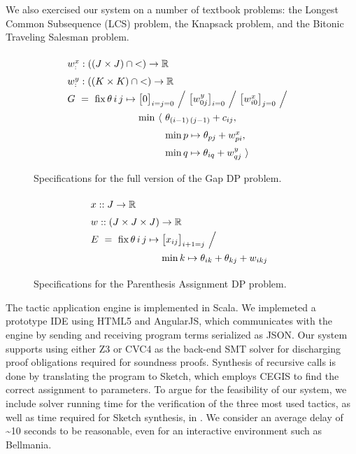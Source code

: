 \medskip
We also exercised our system on a number of textbook problems:
the Longest Common Subsequence (LCS) problem, the Knapsack problem,
and the Bitonic Traveling Salesman problem.

\begin{figure}
\[
  \renewcommand\arraystretch{1.5}
  \begin{array}{@{}l@{}l@{}l@{}}
    \lspan3{\xw :: ((J\times J)\cap{<})\to\R} \\
    \lspan3{\yw :: ((K\times K)\cap{<})\to\R} \\
    G ~=~ \fix \theta\,i\,j\mapsto{}
      & \lspan2{\big[0\big]_{i=j=0} ~\Big/~ \big[\yw{0j}\big]_{i=0} ~\Big/~ \big[\xw{i0}\big]_{j=0} ~\Big/~} \\
      & \min~\langle~ & \theta_{(i-1)\,(j-1)} + c_{ij},\\
      & & \min p\mapsto\theta_{pj}+\xw{pi}, \\
      & & \min q\mapsto\theta_{iq}+\yw{qj} ~\rangle
  \end{array}
\]
\caption{\label{evaluation:gap spec}
  Specifications for the full version of the Gap DP problem.}
\end{figure}

\begin{figure}
\[
  \renewcommand\arraystretch{1.5}
  \begin{array}{@{}l@{}l}
    \lspan2{x :: J\to\R} \\
    \lspan2{w :: (J\times J\times J)\to\R} \\
    E ~=~ \fix \theta\,i\,j\mapsto{}
      & {\big[x_{ij}\big]_{i+1=j} ~\Big/~} \\
      & \min k\mapsto\theta_{ik}+\theta_{kj}+w_{ikj} \\
  \end{array}
\]
\caption{\label{evaluation:paren spec}
  Specifications for the Parenthesis Assignment DP problem.}
\end{figure}


The tactic application engine is implemented in Scala. We implemeted a prototype
IDE using HTML5 and AngularJS, which communicates with the engine by sending
and receiving program terms serialized as JSON. Our system supports using either
Z3 or CVC4 as the back-end SMT solver for discharging proof obligations required
for soundness proofs. Synthesis of recursive calls is done by translating the
program to Sketch, which employs CEGIS to find the correct assignment to parameters.
To argue for the feasibility of our system, we include
solver running time for the verification of the three most used tactics,
as well as time required for Sketch synthesis, in .
We consider an average delay of \textasciitilde 10 seconds to be reasonable, even for an interactive
environment such as Bellmania. 

